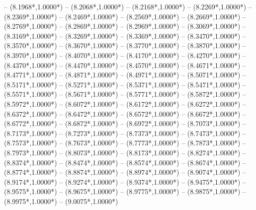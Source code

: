 {	-- ({8.1968*\dx},{1.0000*\dy})
	-- ({8.2068*\dx},{1.0000*\dy})
	-- ({8.2168*\dx},{1.0000*\dy})
	-- ({8.2269*\dx},{1.0000*\dy})
	-- ({8.2369*\dx},{1.0000*\dy})
	-- ({8.2469*\dx},{1.0000*\dy})
	-- ({8.2569*\dx},{1.0000*\dy})
	-- ({8.2669*\dx},{1.0000*\dy})
	-- ({8.2769*\dx},{1.0000*\dy})
	-- ({8.2869*\dx},{1.0000*\dy})
	-- ({8.2969*\dx},{1.0000*\dy})
	-- ({8.3069*\dx},{1.0000*\dy})
	-- ({8.3169*\dx},{1.0000*\dy})
	-- ({8.3269*\dx},{1.0000*\dy})
	-- ({8.3369*\dx},{1.0000*\dy})
	-- ({8.3470*\dx},{1.0000*\dy})
	-- ({8.3570*\dx},{1.0000*\dy})
	-- ({8.3670*\dx},{1.0000*\dy})
	-- ({8.3770*\dx},{1.0000*\dy})
	-- ({8.3870*\dx},{1.0000*\dy})
	-- ({8.3970*\dx},{1.0000*\dy})
	-- ({8.4070*\dx},{1.0000*\dy})
	-- ({8.4170*\dx},{1.0000*\dy})
	-- ({8.4270*\dx},{1.0000*\dy})
	-- ({8.4370*\dx},{1.0000*\dy})
	-- ({8.4470*\dx},{1.0000*\dy})
	-- ({8.4570*\dx},{1.0000*\dy})
	-- ({8.4671*\dx},{1.0000*\dy})
	-- ({8.4771*\dx},{1.0000*\dy})
	-- ({8.4871*\dx},{1.0000*\dy})
	-- ({8.4971*\dx},{1.0000*\dy})
	-- ({8.5071*\dx},{1.0000*\dy})
	-- ({8.5171*\dx},{1.0000*\dy})
	-- ({8.5271*\dx},{1.0000*\dy})
	-- ({8.5371*\dx},{1.0000*\dy})
	-- ({8.5471*\dx},{1.0000*\dy})
	-- ({8.5571*\dx},{1.0000*\dy})
	-- ({8.5671*\dx},{1.0000*\dy})
	-- ({8.5771*\dx},{1.0000*\dy})
	-- ({8.5872*\dx},{1.0000*\dy})
	-- ({8.5972*\dx},{1.0000*\dy})
	-- ({8.6072*\dx},{1.0000*\dy})
	-- ({8.6172*\dx},{1.0000*\dy})
	-- ({8.6272*\dx},{1.0000*\dy})
	-- ({8.6372*\dx},{1.0000*\dy})
	-- ({8.6472*\dx},{1.0000*\dy})
	-- ({8.6572*\dx},{1.0000*\dy})
	-- ({8.6672*\dx},{1.0000*\dy})
	-- ({8.6772*\dx},{1.0000*\dy})
	-- ({8.6872*\dx},{1.0000*\dy})
	-- ({8.6972*\dx},{1.0000*\dy})
	-- ({8.7073*\dx},{1.0000*\dy})
	-- ({8.7173*\dx},{1.0000*\dy})
	-- ({8.7273*\dx},{1.0000*\dy})
	-- ({8.7373*\dx},{1.0000*\dy})
	-- ({8.7473*\dx},{1.0000*\dy})
	-- ({8.7573*\dx},{1.0000*\dy})
	-- ({8.7673*\dx},{1.0000*\dy})
	-- ({8.7773*\dx},{1.0000*\dy})
	-- ({8.7873*\dx},{1.0000*\dy})
	-- ({8.7973*\dx},{1.0000*\dy})
	-- ({8.8073*\dx},{1.0000*\dy})
	-- ({8.8173*\dx},{1.0000*\dy})
	-- ({8.8274*\dx},{1.0000*\dy})
	-- ({8.8374*\dx},{1.0000*\dy})
	-- ({8.8474*\dx},{1.0000*\dy})
	-- ({8.8574*\dx},{1.0000*\dy})
	-- ({8.8674*\dx},{1.0000*\dy})
	-- ({8.8774*\dx},{1.0000*\dy})
	-- ({8.8874*\dx},{1.0000*\dy})
	-- ({8.8974*\dx},{1.0000*\dy})
	-- ({8.9074*\dx},{1.0000*\dy})
	-- ({8.9174*\dx},{1.0000*\dy})
	-- ({8.9274*\dx},{1.0000*\dy})
	-- ({8.9374*\dx},{1.0000*\dy})
	-- ({8.9475*\dx},{1.0000*\dy})
	-- ({8.9575*\dx},{1.0000*\dy})
	-- ({8.9675*\dx},{1.0000*\dy})
	-- ({8.9775*\dx},{1.0000*\dy})
	-- ({8.9875*\dx},{1.0000*\dy})
	-- ({8.9975*\dx},{1.0000*\dy})
	-- ({9.0075*\dx},{1.0000*\dy})
}
